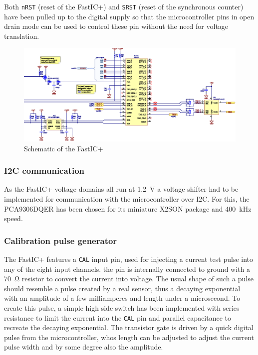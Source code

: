 \documentclass{cernatsnote}
\begin{document}
Both \verb|nRST| (reset of the FastIC+) and \verb|SRST| (reset of the synchronous counter) have been pulled up to the digital supply so that the microcontroller pins in open drain mode can be used to control these pin without the need for voltage translation. 

\FloatBarrier
\begin{figure}[htp!]
    \centering
    \includegraphics[scale=0.8]{schematic/fastic.eps}
    \caption{Schematic of the FastIC+}
    \label{fig:fastic}
\end{figure}


%
\subsubsection{I2C communication}
As the FastIC+ voltage domains all run at \SI{1.2}{\volt} a voltage shifter had to be implemented for communication with the microcontroller over I2C. For this, the PCA9306DQER has been chosen for its miniature X2SON package and \SI{400}{\kilo\hertz} speed. 
%
\subsubsection{Calibration pulse generator}
The FastIC+ features a \verb|CAL| input pin, used for injecting a current test pulse into any of the eight input channels. the pin is internally connected to ground with a \SI{70}{\ohm} resistor to convert the current into voltage. The usual shape of such a pulse should resemble a pulse created by a real sensor, thus a decaying exponential with an amplitude of a few milliamperes and length under a microsecond. To create this pulse, a simple high side switch has been implemented with series resistance to limit the current into the \verb|CAL| pin and parallel capacitance to recreate the decaying exponential. The transistor gate is driven by a quick digital pulse from the microcontroller, whos length can be adjusted to adjust the current pulse width and by some degree also the amplitude. 
%
\end{document}
